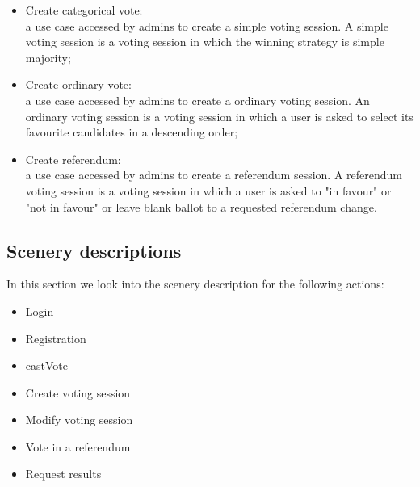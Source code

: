 \documentclass[11pt, oneside]{article}   	%
\begin{document}
\begin{itemize}
    \item Create categorical vote: \\a use case accessed by admins to create a simple voting session. A simple voting session is a voting session in which the winning strategy is simple majority;
    \item Create ordinary vote: \\a use case accessed by admins to create a ordinary voting session. An ordinary voting session is a voting session in which a user is asked to select its favourite candidates in a descending order;
    \item Create referendum: \\a use case accessed by admins to create a referendum session. A referendum voting session is a voting session in which a user is asked to "in favour" or "not in favour" or leave blank ballot to a requested referendum change.
\end{itemize}

\clearpage

\subsection{Scenery descriptions}
In this section we look into the scenery description for the following actions:
\begin{itemize}
    \item Login
    \item Registration
    \item castVote
    \item Create voting session
    \item Modify voting session
    \item Vote in a referendum
    \item Request results
\end{itemize}
\end{document}

